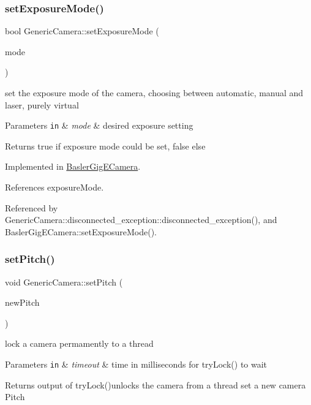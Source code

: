 \subsubsection{\texorpdfstring{set\+Exposure\+Mode()}{setExposureMode()}}
{\footnotesize\ttfamily bool Generic\+Camera\+::set\+Exposure\+Mode (\begin{DoxyParamCaption}\item[{\hyperlink{constants_8h_a6e920987695b1da6e2df4e41dc867e18}{Exposure\+Modes}}]{mode }\end{DoxyParamCaption})\hspace{0.3cm}{\ttfamily [pure virtual]}}

set the exposure mode of the camera, choosing between automatic, manual and laser, purely virtual 
\begin{DoxyParams}[1]{Parameters}
\mbox{\tt in}  & {\em mode} & desired exposure setting \\
\hline
\end{DoxyParams}
\begin{DoxyReturn}{Returns}
true if exposure mode could be set, false else 
\end{DoxyReturn}


Implemented in \hyperlink{classBaslerGigECamera_a228061fb068600be59b4e83c0e8a8e50}{Basler\+Gig\+E\+Camera}.



References exposure\+Mode.



Referenced by Generic\+Camera\+::disconnected\+\_\+exception\+::disconnected\+\_\+exception(), and Basler\+Gig\+E\+Camera\+::set\+Exposure\+Mode().

\mbox{\label{classGenericCamera_aae87f93ed0741bbfa4881f551cd1a73c}} 
\subsubsection{\texorpdfstring{set\+Pitch()}{setPitch()}}
{\footnotesize\ttfamily void Generic\+Camera\+::set\+Pitch (\begin{DoxyParamCaption}\item[{double}]{new\+Pitch }\end{DoxyParamCaption})\hspace{0.3cm}{\ttfamily [inline]}}

lock a camera permamently to a thread 
\begin{DoxyParams}[1]{Parameters}
\mbox{\tt in}  & {\em timeout} & time in milliseconds for try\+Lock() to wait \\
\hline
\end{DoxyParams}
\begin{DoxyReturn}{Returns}
output of try\+Lock()unlocks the camera from a thread set a new camera Pitch 
\end{DoxyReturn}

